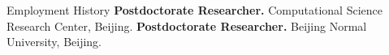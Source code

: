 \begin{rubric}{Employment History}
\entry*[2021 -- 2023]%
	\textbf{Postdoctorate Researcher.} Computational Science Research Center, Beijing.
%
%
\entry*[2019 -- 2021]%
	\textbf{Postdoctorate Researcher.} Beijing Normal University, Beijing.%
\end{rubric}